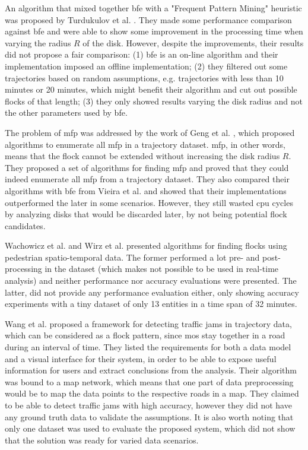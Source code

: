 An algorithm that mixed together \ac{bfe} \citep{vieira} with a "Frequent Pattern Mining" heuristic was proposed by
Turdukulov et al. \citep{visual}. They made some performance comparison against \ac{bfe} and were able to show some
improvement in the processing time when varying the radius $R$ of the disk. However, despite the improvements, their
results did not propose a fair comparison: (1) \ac{bfe} is an on-line algorithm and their implementation imposed an
offline implementation; (2) they filtered out some trajectories based on random assumptions, e.g. trajectories with less
than 10 minutes or 20 minutes, which might benefit their algorithm and cut out possible flocks of that length; (3) they
only showed results varying the disk radius and not the other parameters used by \ac{bfe}.

The problem of \ac{mfp} was addressed by the work of Geng et al. \citep{enumeration}, which proposed algorithms to
enumerate all \ac{mfp} in a trajectory dataset. \ac{mfp}, in other words, means that the flock cannot be extended
without increasing the disk radius $R$. They proposed a set of algorithms for finding \ac{mfp} and proved that they
could indeed enumerate all \ac{mfp} from a trajectory dataset. They also compared their algorithms with \ac{bfe} from
Vieira et al. \citep{vieira} and showed that their implementations outperformed the later in some scenarios. However,
they still wasted \ac{cpu} cycles by analyzing disks that would be discarded later, by not being potential flock
candidates.

Wachowicz et al. \citep{flockpedestrian} and Wirz et al. \citep{pedestriancanyons} presented algorithms for finding
flocks using pedestrian spatio-temporal data. The former performed a lot pre- and post-processing in the dataset (which
makes not possible to be used in real-time analysis) and neither performance nor accuracy evaluations were presented.
The latter, did not provide any performance evaluation either, only showing accuracy experiments with a tiny dataset of
only 13 entities in a time span of 32 minutes.

Wang et al. \citep{visualtrafficjam} proposed a framework for detecting traffic jams in trajectory data, which can be
considered as a flock pattern, since \acp{mo} stay together in a road during an interval of time. They listed the
requirements for both a data model and a visual interface for their system, in order to be able to expose useful
information for users and extract conclusions from the analysis. Their algorithm was bound to a map network, which means
that one part of data preprocessing would be to map the data points to the respective roads in a map. They claimed to be
able to detect traffic jams with high accuracy, however they did not have any ground truth data to validate the
assumptions. It is also worth noting that only one dataset was used to evaluate the proposed system, which did not show
that the solution was ready for varied data scenarios.

